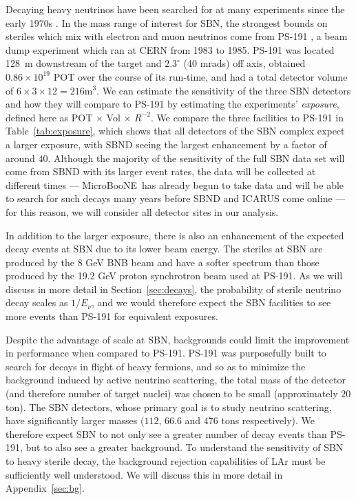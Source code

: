 \documentclass[11pt, a4paper]{article}
\newcommand{\refsec}[1]{Section~\ref{#1}}
\newcommand{\refapp}[1]{Appendix~\ref{#1}}
\newcommand{\reftab}[1]{Table~\ref{#1}}
\def\muboone{MicroBooNE}
\begin{document}
Decaying heavy neutrinos have been searched for at many experiments since the
early 1970s \cite{}. In the mass range of interest for SBN, the strongest
bounds on steriles which mix with electron and muon neutrinos come from PS-191
\cite{Bernardi:1985ny}, a beam dump experiment which ran at CERN from 1983 to
1985. 
%
PS-191 was located 128~m downstream of the target and $2.3^\circ$ (40 mrads) off
axis, obtained $0.86 \times 10^{19}$ POT over the course of its run-time, and
had a total detector volume of $6\times3\times12 = 216 \text{m}^3$. We can
estimate the sensitivity of the three SBN detectors and how they will compare
to PS-191 by estimating the experiments' \emph{exposure}, defined here as POT
$\times$ Vol $\times$ $R^{-2}$. We compare the three facilities to PS-191 in
\reftab{tab:exposure}, which shows that all detectors of the SBN complex expect
a larger exposure, with SBND seeing the largest enhancement by a factor of
around $40$. Although the majority of the sensitivity of the full SBN data set
will come from SBND with its larger event rates, the data will be collected at
different times --- \muboone\ has already begun to take data and will be able
to search for such decays many years before SBND and ICARUS come online --- for
this reason, we will consider all detector sites in our analysis.

In addition to the larger exposure, there is also an enhancement of the
expected decay events at SBN due to its lower beam energy. The steriles at SBN
are produced by the 8 GeV BNB beam and have a softer spectrum than those
produced by the 19.2 GeV proton synchrotron beam used at PS-191. As we will
discuss in more detail in \refsec{sec:decays}, the probability of sterile
neutrino decay scales as $1/E_\nu$, and we would therefore expect the SBN
facilities to see more events than PS-191 for equivalent exposures.

Despite the advantage of scale at SBN, backgrounds could limit the improvement
in performance when compared to PS-191. PS-191 was purposefully built to search
for decays in flight of heavy fermions, and so as to minimize the background
induced by active neutrino scattering, the total mass of the detector (and
therefore number of target nuclei) was chosen to be small (approximately $20$
ton).  The SBN detectors, whose primary goal is to study neutrino scattering,
have significantly larger masses ($112$, $66.6$ and $476$ tons respectively).
We therefore expect SBN to not only see a greater number of decay events than
PS-191, but to also see a greater background. 
%
To understand the sensitivity of SBN to heavy sterile decay, the background
rejection capabilities of LAr must be sufficiently well understood. We will
discuss this in more detail in \refapp{sec:bg}.
\end{document}
